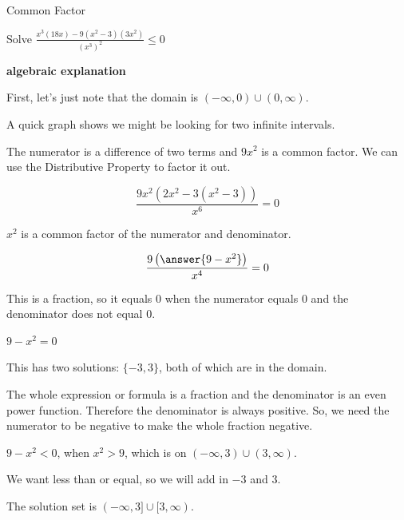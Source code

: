 \documentclass{ximera}
\begin{document}
\begin{example}  Common Factor


Solve $\frac{x^3 (18x) - 9(x^2-3)(3x^2)}{(x^3)^2} \leq 0$



\textbf{\textcolor{red!75!green}{algebraic explanation}} 

First, let's just note that the domain is $(-\infty, 0) \cup (0, \infty)$. 

A quick graph shows we might be looking for two infinite intervals.



\begin{center}
\end{center}







The numerator is a difference of two terms and $9 x^2$ is a common factor.  We can use the Distributive Property to factor it out.



\[ \frac{9x^2 (2x^2 - 3(x^2-3))}{x^6} = 0 \]



$x^2$ is a common factor of the numerator and denominator.


\[ \frac{9 \left( \answer{9 - x^2} \right)}{x^4} = 0 \]



This is a fraction, so it equals $0$ when the numerator equals $0$ and the denominator does not equal $0$.


$9 - x^2 = 0$

This has two solutions: $\{ -3, 3  \}$, both of which are in the domain. 


The whole expression or formula is a fraction and the denominator is an even power function. Therefore the denominator is always positive. So, we need the numerator to be negative to make the whole fraction negative.


$9 - x^2 < 0$, when $x^2 > 9$, which is on $(-\infty, 3) \cup (3, \infty)$.

We want less than or equal, so we will add in $-3$ and $3$.


The solution set is $(-\infty, 3] \cup [3, \infty)$.



\end{example}
\end{document}
